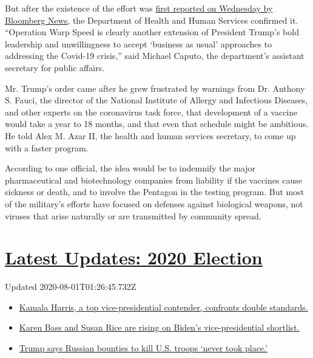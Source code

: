 But after the existence of the effort was
\href{https://www.bloomberg.com/news/articles/2020-04-29/trump-s-operation-warp-speed-aims-to-rush-coronavirus-vaccine}{first
reported on Wednesday by Bloomberg News}, the Department of Health and
Human Services confirmed it. ``Operation Warp Speed is clearly another
extension of President Trump's bold leadership and unwillingness to
accept `business as usual' approaches to addressing the Covid-19
crisis,'' said Michael Caputo, the department's assistant secretary for
public affairs.

Mr. Trump's order came after he grew frustrated by warnings from Dr.
Anthony S. Fauci, the director of the National Institute of Allergy and
Infectious Diseases, and other experts on the coronavirus task force,
that development of a vaccine would take a year to 18 months, and that
even that schedule might be ambitious. He told Alex M. Azar II, the
health and human services secretary, to come up with a faster program.

According to one official, the idea would be to indemnify the major
pharmaceutical and biotechnology companies from liability if the
vaccines cause sickness or death, and to involve the Pentagon in the
testing program. But most of the military's efforts have focused on
defenses against biological weapons, not viruses that arise naturally or
are transmitted by community spread.

\hypertarget{latest-updates-2020-election}{%
\section{\texorpdfstring{\href{https://www.nytimes.com/2020/07/31/us/elections/biden-vs-trump.html?action=click\&pgtype=Article\&state=default\&region=MAIN_CONTENT_1\&context=storylines_live_updates}{Latest
Updates: 2020
Election}}{Latest Updates: 2020 Election}}\label{latest-updates-2020-election}}

Updated 2020-08-01T01:26:45.732Z

\begin{itemize}
\tightlist
\item
  \href{https://www.nytimes.com/2020/07/31/us/elections/biden-vs-trump.html?action=click\&pgtype=Article\&state=default\&region=MAIN_CONTENT_1\&context=storylines_live_updates\#link-29fdff45}{Kamala
  Harris, a top vice-presidential contender, confronts double
  standards.}
\item
  \href{https://www.nytimes.com/2020/07/31/us/elections/biden-vs-trump.html?action=click\&pgtype=Article\&state=default\&region=MAIN_CONTENT_1\&context=storylines_live_updates\#link-13ec3d9c}{Karen
  Bass and Susan Rice are rising on Biden's vice-presidential
  shortlist.}
\item
  \href{https://www.nytimes.com/2020/07/31/us/elections/biden-vs-trump.html?action=click\&pgtype=Article\&state=default\&region=MAIN_CONTENT_1\&context=storylines_live_updates\#link-49e9a016}{Trump
  says Russian bounties to kill U.S. troops `never took place.'}
\end{itemize}

